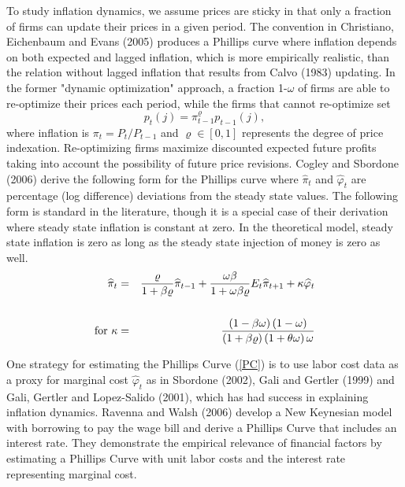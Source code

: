 \documentclass{article}
\begin{document}
To study inflation dynamics, we assume prices are sticky in that only a
fraction of firms can update their prices in a given period. The
convention in Christiano, Eichenbaum and Evans (2005) produces a Phillips
curve where inflation depends on both expected and lagged inflation, which
is more empirically realistic, than the relation without lagged inflation
that results from Calvo (1983) updating. In the former "dynamic
optimization" approach, a fraction 1-$\omega$ of firms are able to
re-optimize their prices each period, while the firms that cannot
re-optimize set
\begin{equation*}
p_{t}\left( j\right) =\pi _{t-1}^{\varrho }p_{t-1}\left( j\right) ,
\end{equation*}
where inflation is $\pi _{t}=P_{t}/P_{t-1}$ and $\varrho \in \left[ 0,1%
\right]$ represents the degree of price indexation. Re-optimizing firms
maximize discounted expected future profits taking into account the
possibility of future price revisions. Cogley and Sbordone (2006) derive
the following form for the Phillips curve where $\widehat{\pi }_{t}$ and $%
\widehat{\varphi }_{t}$ are percentage (log difference) deviations from the
steady state values. The following form is standard in the literature,
though it is a special case of their derivation where steady state inflation
is constant at zero. In the theoretical model, steady state inflation is
zero as long as the steady state injection of money is zero as well.
\begin{eqnarray}
\widehat{\pi }_{t} &=&\frac{\varrho }{1+\beta \varrho }\widehat{\pi }_{t-1}+%
\frac{\omega \beta }{1+\omega \beta \varrho }E_{t}\widehat{\pi }%
_{t+1}+\kappa \widehat{\varphi }_{t}  \label{PC MC} \\
&&  \notag \\
\text{for }\kappa &=&\dfrac{\left( 1-\beta \omega \right) \left( 1-\omega
\right) }{\left( 1+\beta \varrho \right) \left( 1+\theta \omega \right)
\omega }  \notag
\end{eqnarray}

One strategy for estimating the Phillips Curve (\ref{PC}) is to use labor
cost data as a proxy for marginal cost $\widehat{\varphi }_{t}$ as in
Sbordone (2002), Gali and Gertler (1999) and Gali, Gertler and Lopez-Salido
(2001), which has had success in explaining inflation dynamics. Ravenna
and Walsh (2006) develop a New Keynesian model with borrowing to pay the
wage bill and derive a Phillips Curve that includes an interest rate. They
demonstrate the empirical relevance of financial factors by estimating a
Phillips Curve with unit labor costs and the interest rate representing
marginal cost.
\end{document}
